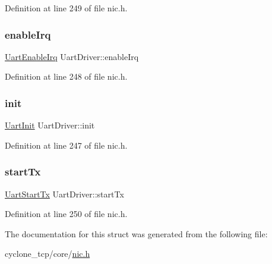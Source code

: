 Definition at line 249 of file nic.\+h.

\mbox{\label{structUartDriver_a8145020e65ebaa8ed409511078b5aa48}} 
\subsubsection{\texorpdfstring{enable\+Irq}{enableIrq}}
{\footnotesize\ttfamily \hyperlink{nic_8h_ad360b535e20add52396382193c5c9cd9}{Uart\+Enable\+Irq} Uart\+Driver\+::enable\+Irq}



Definition at line 248 of file nic.\+h.

\mbox{\label{structUartDriver_a21eb90a91560951c4fe7ee7ba5456850}} 
\subsubsection{\texorpdfstring{init}{init}}
{\footnotesize\ttfamily \hyperlink{nic_8h_ad480784aefd824e7a159728df3c51643}{Uart\+Init} Uart\+Driver\+::init}



Definition at line 247 of file nic.\+h.

\mbox{\label{structUartDriver_a223db3e6a7b736919818c7669c24dd53}} 
\subsubsection{\texorpdfstring{start\+Tx}{startTx}}
{\footnotesize\ttfamily \hyperlink{nic_8h_a06153573bb814bc87bf01b68a91a4de5}{Uart\+Start\+Tx} Uart\+Driver\+::start\+Tx}



Definition at line 250 of file nic.\+h.



The documentation for this struct was generated from the following file\+:\begin{DoxyCompactItemize}
\item 
cyclone\+\_\+tcp/core/\hyperlink{nic_8h}{nic.\+h}\end{DoxyCompactItemize}
